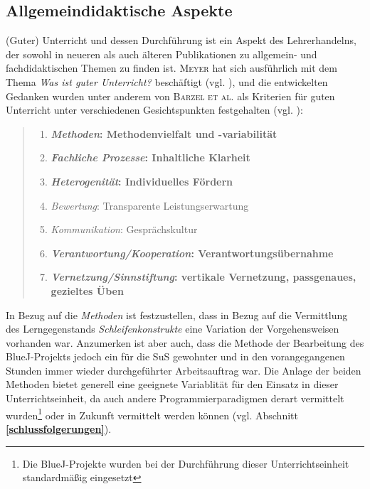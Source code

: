 \documentclass[paper=a4, DIV=13, BCOR=8mm, oneside=on, onecolumn=on, open = any, titlepage =on, parskip =half-, headsepline = on, footsepline = off, chapterprefix = on, sectionprefix = on, appendixprefix = off, fontsize = 12pt, numbers = noenddot, abstract = off]{scrreprt}
\begin{document}
\subsection*{Allgemeindidaktische Aspekte}
\onehalfspacing
\vspace*{-0.5ex}
(Guter) Unterricht und dessen Durchführung ist ein Aspekt des Lehrerhandelns, der sowohl in neueren als auch älteren Publikationen zu allgemein- und fachdidaktischen Themen zu finden ist. \textsc{Meyer} hat sich ausführlich mit dem Thema \emph{Was ist guter Unterricht?} beschäftigt (vgl. \cite{meyer:04}), und die entwickelten Gedanken wurden unter anderem von \textsc{Barzel et al.} als Kriterien für guten Unterricht unter verschiedenen Gesichtspunkten festgehalten (vgl. \cite[S.24f.]{barzel:16}):
\begin{quote}
\singlespacing
\begin{enumerate}
\item \textbf{\emph{Methoden}: Methodenvielfalt und -variabilität}
\item \textbf{\emph{Fachliche Prozesse}: Inhaltliche Klarheit}
\item \textbf{\emph{Heterogenität}: Individuelles Fördern}
\item \emph{Bewertung}: Transparente Leistungserwartung
\item \emph{Kommunikation}: Gesprächskultur
\item \textbf{\emph{Verantwortung/Kooperation}: Verantwortungsübernahme}
\item \textbf{\emph{Vernetzung/Sinnstiftung}: vertikale Vernetzung, passgenaues, gezieltes Üben}
\end{enumerate}
\end{quote}

\onehalfspacing
In Bezug auf die \emph{Methoden} ist festzustellen, dass in Bezug auf die Vermittlung des Lerngegenstands \emph{Schleifenkonstrukte} eine Variation der Vorgehensweisen vorhanden war. Anzumerken ist aber auch, dass die Methode der Bearbeitung des BlueJ-Projekts jedoch ein für die SuS gewohnter und in den vorangegangenen Stunden immer wieder durchgeführter Arbeitsauftrag war. Die Anlage der beiden Methoden bietet generell eine geeignete Variablität für den Einsatz in dieser Unterrichtseinheit, da auch andere Programmierparadigmen derart vermittelt wurden\footnote{Die BlueJ-Projekte wurden bei der Durchführung dieser Unterrichtseinheit standardmäßig eingesetzt} oder in Zukunft vermittelt werden können (vgl. Abschnitt \textbf{\ref{schlussfolgerungen}}).
\end{document}
